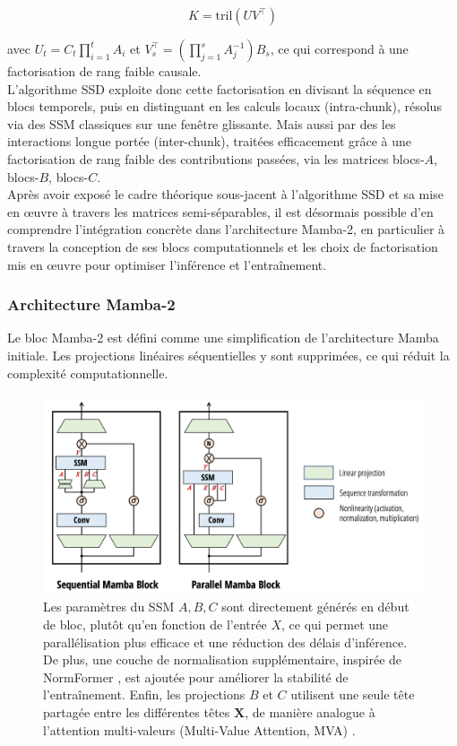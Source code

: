 \begin{equation}
K = \mathrm{tril}(UV^\top)
\end{equation}

avec $\displaystyle U_t = C_t \prod_{i=1}^t A_i$ et $V_s^\top = \displaystyle \left( \prod_{j=1}^s A_j^{-1} \right) B_s$, ce qui correspond à une factorisation de rang faible causale.\\

L’algorithme SSD exploite donc cette factorisation en divisant la séquence en blocs temporels, puis en distinguant en les calculs locaux (intra-chunk), résolus via des SSM classiques sur une fenêtre glissante. Mais aussi par des les interactions longue portée (inter-chunk), traitées efficacement grâce à une factorisation de rang faible des contributions passées, via les matrices blocs-$A$, blocs-$B$, blocs-$C$.\\

Après avoir exposé le cadre théorique sous-jacent à l'algorithme SSD et sa mise en œuvre à travers les matrices semi-séparables, il est désormais possible d'en comprendre l'intégration concrète dans l'architecture Mamba-2, en particulier à travers la conception de ses blocs computationnels et les choix de factorisation mis en œuvre pour optimiser l'inférence et l'entraînement.

\subsubsection{Architecture Mamba-2}

Le bloc Mamba-2 est défini comme une simplification de l'architecture Mamba initiale. Les projections linéaires séquentielles y sont supprimées, ce qui réduit la complexité computationnelle. 

\begin{figure}[H]
    \centering
    \includegraphics[width=1\linewidth]{images/mamba-2_architecture.png}
    \caption{\justifying Les paramètres du SSM \( A, B, C \) sont directement générés en début de bloc, plutôt qu'en fonction de l'entrée \( X \), ce qui permet une parallélisation plus efficace et une réduction des délais d'inférence. De plus, une couche de normalisation supplémentaire, inspirée de NormFormer \cite{shleifer2021normformer}, est ajoutée pour améliorer la stabilité de l'entraînement. Enfin, les projections $B$ et $C$ utilisent une seule tête partagée entre les différentes têtes $\mathbf{X}$, de manière analogue à l'attention multi-valeurs (Multi-Value Attention, MVA) \citep{dao2024mamba2}.}
    \label{fig:enter-label}
\end{figure}

